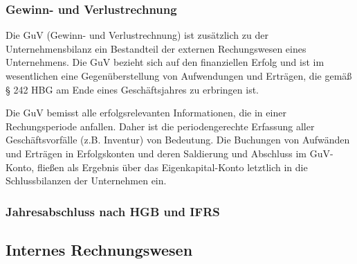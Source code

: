  

\subsubsection{Gewinn- und Verlustrechnung}
Die GuV (Gewinn- und Verlustrechnung) ist zusätzlich zu der Unternehmensbilanz ein Bestandteil der externen Rechungswesen eines Unternehmens. Die GuV bezieht sich auf den finanziellen Erfolg und ist im wesentlichen eine Gegenüberstellung von Aufwendungen und Erträgen, die gemäß § 242 HBG am Ende eines Geschäftsjahres zu erbringen ist. 

Die GuV bemisst alle erfolgsrelevanten Informationen, die in einer Rechungsperiode anfallen. Daher ist die periodengerechte Erfassung aller Geschäftsvorfälle (z.B. Inventur) von Bedeutung. Die Buchungen von Aufwänden und Erträgen in Erfolgskonten und deren Saldierung und Abschluss im GuV-Konto, fließen als Ergebnis über das Eigenkapital-Konto letztlich in die Schlussbilanzen der Unternehmen ein.

\subsubsection{Jahresabschluss nach HGB und IFRS}

\subsection{Internes Rechnungswesen}
\label{ssec:internesRechnungswesen}

